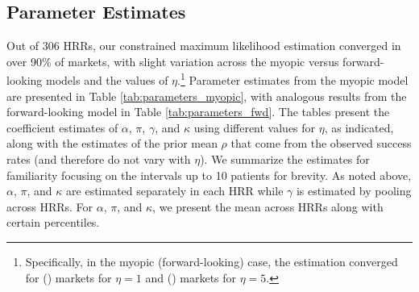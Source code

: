 \documentclass[12pt]{article}
\begin{document}
\subsection{Parameter Estimates}

Out of 306 HRRs, our constrained maximum likelihood estimation converged in over 90\% of markets, with slight variation across the myopic versus forward-looking models and the values of $\eta$.\footnote{Specifically, in the myopic (forward-looking) case, the estimation converged for \nHRRsMyopic{} (\nHRRsFWD{}) markets for $\eta=1$ and \nHRRsEtaFiveMyopic{} (\nHRRsEtaFiveFWD{}) markets for $\eta=5$.} Parameter estimates from the myopic model are presented in Table \ref{tab:parameters_myopic}, with analogous results from the forward-looking model in Table \ref{tab:parameters_fwd}. The tables present the coefficient estimates of $\alpha$, $\pi$, $\gamma$, and $\kappa$ using different values for $\eta$, as indicated, along with the estimates of the prior mean $\rho$ that come from the observed success rates (and therefore do not vary with $\eta$). We summarize the estimates for familiarity focusing on the intervals up to 10 patients for brevity. As noted above, $\alpha$, $\pi$, and $\kappa$ are estimated separately in each HRR while $\gamma$ is estimated by pooling across HRRs. For $\alpha$, $\pi$, and $\kappa$, we present the mean across HRRs along with certain percentiles.
\end{document}
